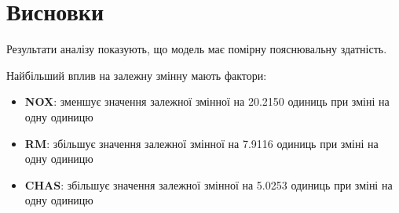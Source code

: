 \documentclass{article}
\begin{document}
    \vspace{0.5cm}

    \section{Висновки}

    Результати аналізу показують, що модель має помірну пояснювальну здатність.
    
    Найбільший вплив на залежну змінну мають фактори:
    \begin{itemize}
        \item \textbf{NOX}: зменшує значення залежної змінної на 20.2150 одиниць при зміні на одну одиницю
    \item \textbf{RM}: збільшує значення залежної змінної на 7.9116 одиниць при зміні на одну одиницю
    \item \textbf{CHAS}: збільшує значення залежної змінної на 5.0253 одиниць при зміні на одну одиницю

    \end{itemize}
    
    
\end{document}
